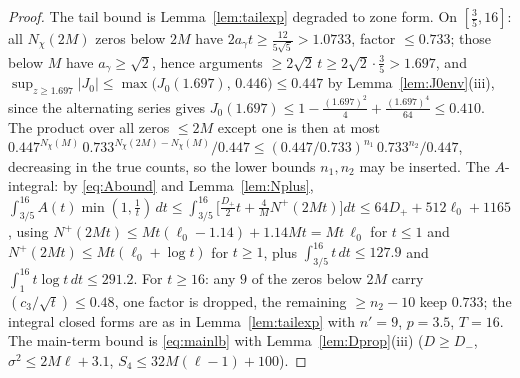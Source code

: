 \documentclass[11pt]{article}
\begin{document}
\begin{proof}
The tail bound is Lemma~\ref{lem:tailexp} degraded to zone form. On
$[\tfrac35,16]$: all $N_\chi(2M)$ zeros below $2M$ have
$2a_\gamma t\ge\tfrac{12}{5\sqrt5}>1.0733$, factor $\le0.733$; those
below $M$ have $a_\gamma\ge\sqrt2$, hence arguments
$\ge2\sqrt2\,t\ge2\sqrt2\cdot\tfrac35>1.697$, and
$\sup_{z\ge1.697}|J_0|\le\max\bigl(J_0(1.697),\,0.446\bigr)
\le0.447$ by Lemma~\ref{lem:J0env}(iii), since the alternating
series gives $J_0(1.697)\le1-\tfrac{(1.697)^2}4
+\tfrac{(1.697)^4}{64}\le0.410$.
The product over all zeros $\le2M$ except one is then at most
$0.447^{N_\chi(M)}\,0.733^{N_\chi(2M)-N_\chi(M)}/0.447
\le(0.447/0.733)^{n_1}\,0.733^{n_2}/0.447$, decreasing in the true
counts, so the lower bounds $n_1,n_2$ may be inserted. The
$A$-integral: by \eqref{eq:Abound} and Lemma~\ref{lem:Nplus},
$\int_{3/5}^{16}A(t)\min(1,\tfrac1t)\,dt
\le\int_{3/5}^{16}\bigl[\tfrac{D_+}2t+\tfrac4MN^+(2Mt)\bigr]dt
\le64D_++512\ell_0+1165$, using
$N^+(2Mt)\le Mt(\ell_0-1.14)+1.14Mt=Mt\,\ell_0$ for $t\le1$ and
$N^+(2Mt)\le Mt(\ell_0+\log t)$ for $t\ge1$, plus
$\int_{3/5}^{16}t\,dt\le127.9$ and $\int_1^{16}t\log t\,dt\le291.2$.
For $t\ge16$: any $9$ of the zeros below $2M$ carry
$(c_3/\sqrt t)\le0.48$, one factor is dropped, the remaining
$\ge n_2-10$ keep $0.733$; the integral closed forms are as in
Lemma~\ref{lem:tailexp} with $n'=9$, $p=3.5$, $T=16$. The main-term
bound is \eqref{eq:mainlb} with Lemma~\ref{lem:Dprop}(iii)
($D\ge D_-$, $\sigma^2\le2M\ell+3.1$, $S_4\le32M(\ell-1)+100$).


\end{proof}
\end{document}
